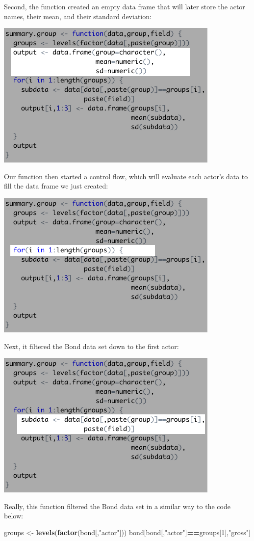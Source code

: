 \documentclass[
]{book}
\newenvironment{Shaded}{\begin{snugshade}}{\end{snugshade}}
\newcommand{\DecValTok}[1]{\textcolor[rgb]{0.00,0.00,0.81}{#1}}
\newcommand{\KeywordTok}[1]{\textcolor[rgb]{0.13,0.29,0.53}{\textbf{#1}}}
\newcommand{\NormalTok}[1]{#1}
\newcommand{\OperatorTok}[1]{\textcolor[rgb]{0.81,0.36,0.00}{\textbf{#1}}}
\newcommand{\StringTok}[1]{\textcolor[rgb]{0.31,0.60,0.02}{#1}}
\begin{document}
\begin{center}
Second, the function created an empty data frame that will later store the actor names, their mean, and their standard deviation:

\begin{center}\includegraphics[width=0.5\linewidth]{1.53_Function_Breakdown} \end{center}

Our function then started a control flow, which will evaluate each actor's data to fill the data frame we just created:

\begin{center}\includegraphics[width=0.5\linewidth]{1.54_Function_Breakdown} \end{center}

Next, it filtered the Bond data set down to the first actor:

\begin{center}\includegraphics[width=0.5\linewidth]{1.55_Function_Breakdown} \end{center}

Really, this function filtered the Bond data set in a similar way to the code below:

\begin{Shaded}
\begin{Highlighting}[]
\NormalTok{groups <-}\StringTok{ }\KeywordTok{levels}\NormalTok{(}\KeywordTok{factor}\NormalTok{(bond[,}\StringTok{"actor"}\NormalTok{]))}
\NormalTok{bond[bond[,}\StringTok{"actor"}\NormalTok{]}\OperatorTok{==}\NormalTok{groups[}\DecValTok{1}\NormalTok{],}\StringTok{"gross"}\NormalTok{]}
\end{Highlighting}
\end{Shaded}


\end{center}
\end{document}
